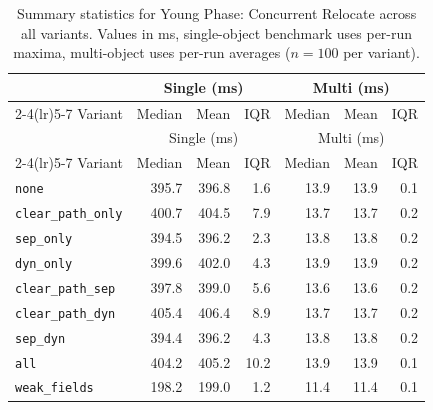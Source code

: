 \begin{longtable}[c]{l rrr rrr}
\caption[Young Phase: Concurrent Relocate summary statistics]{Summary statistics for Young Phase: Concurrent Relocate across all variants. Values in ms, single-object benchmark uses per-run maxima, multi-object uses per-run averages ($n=100$ per variant).}\label{tab:stats-young_relocate} \\
\toprule
 & \multicolumn{3}{c}{Single (ms)} & \multicolumn{3}{c}{Multi (ms)} \\
\cmidrule(lr){2-4}\cmidrule(lr){5-7}
Variant & Median & Mean & IQR & Median & Mean & IQR \\
\midrule
\endfirsthead
\toprule
 & \multicolumn{3}{c}{Single (ms)} & \multicolumn{3}{c}{Multi (ms)} \\
\cmidrule(lr){2-4}\cmidrule(lr){5-7}
Variant & Median & Mean & IQR & Median & Mean & IQR \\
\midrule
\endhead
\bottomrule
\endfoot
\texttt{none} & 395.7 & 396.8 & 1.6 & 13.9 & 13.9 & 0.1 \\
\texttt{clear\_path\_only} & 400.7 & 404.5 & 7.9 & 13.7 & 13.7 & 0.2 \\
\texttt{sep\_only} & 394.5 & 396.2 & 2.3 & 13.8 & 13.8 & 0.2 \\
\texttt{dyn\_only} & 399.6 & 402.0 & 4.3 & 13.9 & 13.9 & 0.2 \\
\texttt{clear\_path\_sep} & 397.8 & 399.0 & 5.6 & 13.6 & 13.6 & 0.2 \\
\texttt{clear\_path\_dyn} & 405.4 & 406.4 & 8.9 & 13.7 & 13.7 & 0.2 \\
\texttt{sep\_dyn} & 394.4 & 396.2 & 4.3 & 13.8 & 13.8 & 0.2 \\
\texttt{all} & 404.2 & 405.2 & 10.2 & 13.9 & 13.9 & 0.1 \\
\texttt{weak\_fields} & 198.2 & 199.0 & 1.2 & 11.4 & 11.4 & 0.1 \\
\end{longtable}
